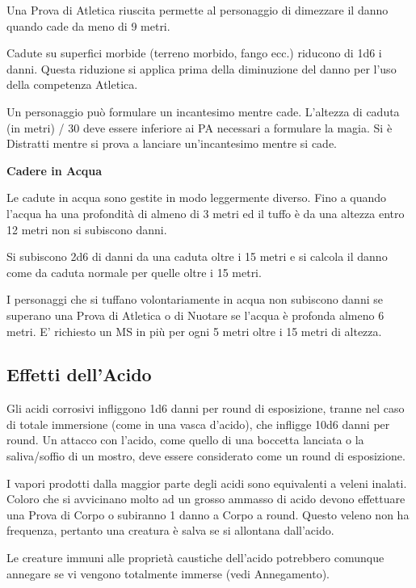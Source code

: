 \documentclass[12pt,a4paper,twoside,openany]{book}
\begin{document}
\begin{multicols}{2}
Una Prova di Atletica riuscita permette al personaggio di dimezzare il danno quando cade da meno di 9 metri.

Cadute su superfici morbide (terreno morbido, fango ecc.) riducono di 1d6 i danni. Questa riduzione si applica prima della diminuzione del danno per l'uso della competenza Atletica.

Un personaggio può formulare un incantesimo mentre cade. L'altezza di caduta (in metri) / 30 deve essere inferiore ai PA necessari a formulare la magia. Si è Distratti mentre si prova a lanciare un'incantesimo mentre si cade.

\medskip

\textbf{Cadere in Acqua}

Le cadute in acqua sono gestite in modo leggermente diverso. Fino a quando l'acqua ha una profondità di almeno di 3 metri ed il tuffo è da una altezza entro 12 metri non si subiscono danni.

Si subiscono 2d6 di danni da una caduta oltre i 15 metri e si calcola il danno come da caduta normale per quelle oltre i 15 metri.

I personaggi che si tuffano volontariamente in acqua non subiscono danni se superano una Prova di Atletica o di Nuotare se l'acqua è profonda almeno 6 metri. E' richiesto un MS in più per ogni 5 metri oltre i 15 metri di altezza.

\subsection{Effetti dell'Acido}

\label{effetti-dellacido}

Gli acidi corrosivi infliggono 1d6 danni per round di esposizione, tranne nel caso di totale immersione (come in una vasca d'acido), che infligge 10d6 danni per round. Un attacco con l'acido, come quello di una boccetta lanciata o la saliva/soffio di un mostro, deve essere considerato come un round di esposizione.

I vapori prodotti dalla maggior parte degli acidi sono equivalenti a veleni inalati. Coloro che si avvicinano molto ad un grosso ammasso di acido devono effettuare una Prova di Corpo o subiranno 1 danno a Corpo a round. Questo veleno non ha frequenza, pertanto una creatura è salva se si allontana dall'acido.

Le creature immuni alle proprietà caustiche dell'acido potrebbero comunque annegare se vi vengono totalmente immerse (vedi Annegamento).


\end{multicols}
\end{document}
